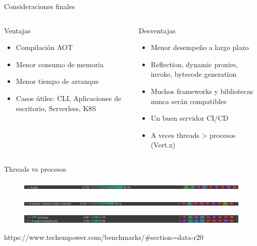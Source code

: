 \documentclass[aspectratio=169]{beamer}
\begin{document}
\begin{frame}{Consideraciones finales}
	
	\begin{columns}[T] %
		
		\begin{column}[T]{4cm} %
			\begin{exampleblock}{Ventajas}
				\begin{itemize}
					\item Compilación AOT
					\item Menor consumo de memoria
					\item Menor tiempo de arranque
					\item Casos útiles: CLI, Aplicaciones de escritorio, Serverless, K8S
				\end{itemize}
			\end{exampleblock}
		\end{column}
		\begin{column}[T]{6cm} %
			\begin{alertblock}{Desventajas}
				\begin{itemize}
					\item Menor desempeño a largo plazo
					\item Reflection, dynamic proxies, invoke, bytecode generation
					\item Muchos frameworks y bibliotecas nunca serán compatibles
					\item Un buen servidor CI/CD
					\item A veces threads > procesos (Vert.x)
				\end{itemize}
			\end{alertblock}
		\end{column}
	\end{columns}
\end{frame}


\begin{frame}{Threads vs procesos}
	\begin{figure}
		\centering
		\includegraphics[width=\linewidth]{Images/rank0}
	\end{figure}
	
	\begin{figure}
		\centering
		\includegraphics[width=\linewidth]{Images/rank1}
	\end{figure}
	
	\begin{figure}
		\centering
		\includegraphics[width=\linewidth]{Images/rank2}
	\end{figure}
{\tiny https://www.techempower.com/benchmarks/\#section=data-r20}
\end{frame}
\end{document}

